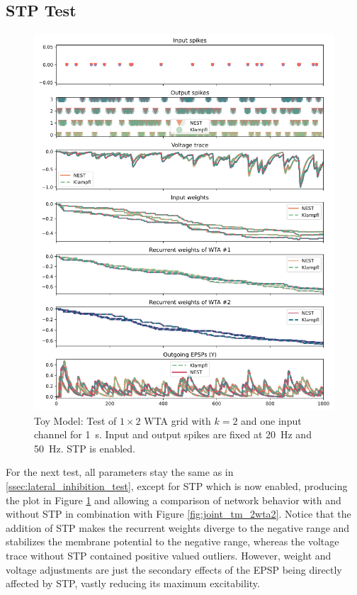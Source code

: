 \subsection{STP Test} \label{ssec:stp_test}
\begin{figure}[htbp]
    \centering
    \includegraphics[width=\columnwidth]{Figures/joint_tm_2wta2_stp.png}
    \caption{Toy Model: Test of $1\times 2$ WTA grid with $k=2$ and one input channel for \SI{1}{\second}. Input and output spikes are fixed at \SI{20}{\hertz} and \SI{50}{\hertz}. STP is enabled.}
    \label{fig:joint_tm_2wta2_stp}
\end{figure}
For the next test, all parameters stay the same as in \ref{ssec:lateral_inhibition_test}, except for STP which is now enabled, producing the plot in Figure \ref{fig:joint_tm_2wta2_stp} and allowing a comparison of network behavior with and without STP in combination with Figure \ref{fig:joint_tm_2wta2}. Notice that the addition of STP makes the recurrent weights diverge to the negative range and stabilizes the membrane potential to the negative range, whereas the voltage trace without STP contained positive valued outliers. However, weight and voltage adjustments are just the secondary effects of the EPSP being directly affected by STP, vastly reducing its maximum excitability.


